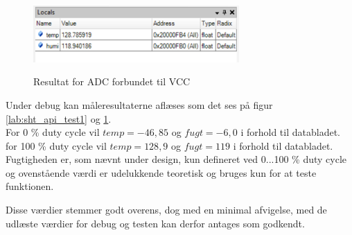 \begin{figure}[htb]
\centering
{\includegraphics[width=0.70\textwidth]{filer/modultest/Billeder/psoc_api_test2}}
\caption{Resultat for ADC forbundet til VCC}
\label{lab:sht_api_test2}
\end{figure}

Under debug kan måleresultaterne aflæses som det ses på figur \ref{lab:sht_api_test1} og \ref{lab:sht_api_test2}. \\
For 0 \% duty cycle vil $temp = -46,85$ og $fugt = -6,0$ i forhold til databladet. \\
for 100 \% duty cycle vil $temp = 128,9$ og $fugt = 119$ i forhold til databladet. \\
Fugtigheden er, som nævnt under design, kun defineret ved 0...100 \% duty cycle og ovenstående værdi er udelukkende teoretisk og bruges kun for at teste funktionen. 

Disse værdier stemmer godt overens, dog med en minimal afvigelse, med de udlæste værdier for debug og testen kan derfor antages som godkendt.